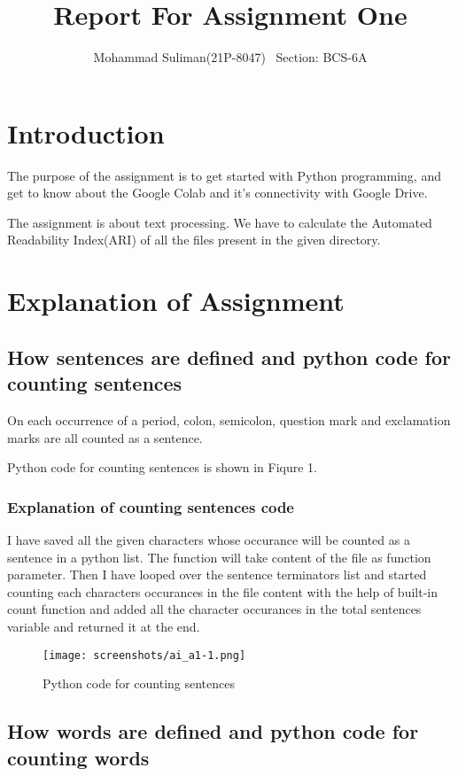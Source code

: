 \documentclass{article}
\title{Report For Assignment One}
\author{Mohammad Suliman(21P-8047) \ Section: BCS-6A}
\begin{document}
\maketitle

\section{Introduction}

The purpose of the assignment is to get started with Python programming, and get to know about the Google Colab and it's connectivity with Google Drive.

The assignment is about text processing. We have to calculate the Automated Readability Index(ARI) of all the files present in the given directory. 

\section{Explanation of Assignment}

\subsection{How sentences are defined and python code for counting sentences}

On each occurrence of a period, colon, semicolon, question mark and exclamation marks are all counted as a sentence. 

Python code for counting sentences is shown in Fiqure 1.
\subsubsection{Explanation of counting sentences code}
I have saved all the given characters whose occurance will be counted as a sentence in a python list. The function will take content of the file as function parameter. Then I have looped over the sentence terminators list and started counting each characters occurances in the file content with the help of built-in count function and added all the character occurances in the total sentences variable and returned it at the end. 

\begin{figure}
\centering
\texttt{[image: screenshots/ai\_a1-1.png]}
\caption{\label{fig:python_code_counting_sentences}Python code for counting sentences}
\end{figure}

\subsection{How words are defined and python code for counting words}
\end{document}
